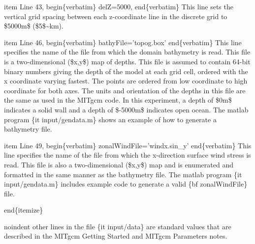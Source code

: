 \documentclass[letterpaper,10pt,english]{sphinxmanual}
\begin{document}
item Line 43,
begin\{verbatim\}
delZ=5000,
end\{verbatim\}
This line sets the vertical grid spacing between each z-coordinate line
in the discrete grid to \$5000m\$ (\$5\$\textasciitilde{}km).

item Line 46,
begin\{verbatim\}
bathyFile='topog.box'
end\{verbatim\}
This line specifies the name of the file from which the domain
bathymetry is read. This file is a two-dimensional (\$x,y\$) map of
depths. This file is assumed to contain 64-bit binary numbers
giving the depth of the model at each grid cell, ordered with the x
coordinate varying fastest. The points are ordered from low coordinate
to high coordinate for both axes. The units and orientation of the
depths in this file are the same as used in the MITgcm code. In this
experiment, a depth of \$0m\$ indicates a solid wall and a depth
of \$-5000m\$ indicates open ocean. The matlab program
\{it input/gendata.m\} shows an example of how to generate a
bathymetry file.

item Line 49,
begin\{verbatim\}
zonalWindFile='windx.sin\_y'
end\{verbatim\}
This line specifies the name of the file from which the x-direction
surface wind stress is read. This file is also a two-dimensional
(\$x,y\$) map and is enumerated and formatted in the same manner as the
bathymetry file. The matlab program \{it input/gendata.m\} includes example
code to generate a valid \{bf zonalWindFile\} file.

end\{itemize\}

noindent other lines in the file \{it input/data\} are standard values
that are described in the MITgcm Getting Started and MITgcm Parameters
notes.
\end{document}
